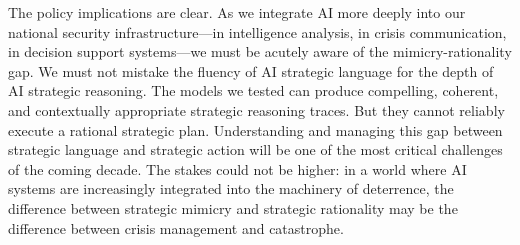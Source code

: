 \documentclass[12pt]{article}
\theoremstyle{plain}
\theoremstyle{definition}
\begin{document}
The policy implications are clear. As we integrate AI more deeply into our national security infrastructure---in intelligence analysis, in crisis communication, in decision support systems---we must be acutely aware of the mimicry-rationality gap. We must not mistake the fluency of AI strategic language for the depth of AI strategic reasoning. The models we tested can produce compelling, coherent, and contextually appropriate strategic reasoning traces. But they cannot reliably execute a rational strategic plan. Understanding and managing this gap between strategic language and strategic action will be one of the most critical challenges of the coming decade. The stakes could not be higher: in a world where AI systems are increasingly integrated into the machinery of deterrence, the difference between strategic mimicry and strategic rationality may be the difference between crisis management and catastrophe.



\end{document}
